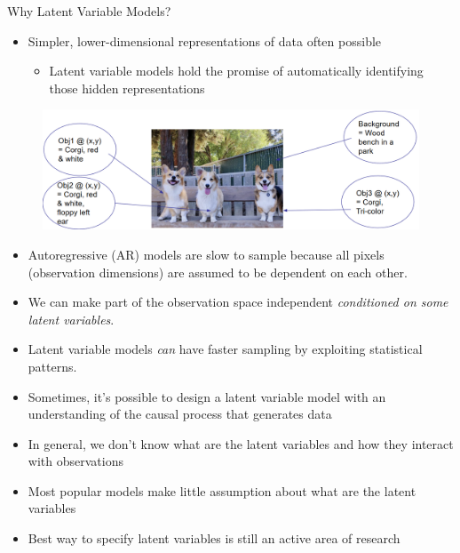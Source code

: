 \begin{frame}[allowframebreaks]{Why Latent Variable Models?}
    \begin{itemize}
        \item Simpler, lower-dimensional representations of data often possible
        \begin{itemize}
            \item Latent variable models hold the promise of automatically identifying those hidden representations
        \end{itemize}
    \end{itemize}
    \begin{figure}
        \centering
        \includegraphics[height=0.5\textheight]{images/vae/why-latent.png}
    \end{figure}

    \framebreak

    \begin{itemize}
        \item Autoregressive (AR) models are slow to sample because all pixels (observation dimensions) are assumed to be dependent on each other.
        \item We can make part of the observation space independent \textit{conditioned on some latent variables}.
        \item Latent variable models \textit{can} have faster sampling by exploiting statistical patterns.
    \end{itemize}

    \framebreak

    \begin{itemize}
        \item Sometimes, it’s possible to design a latent variable model with an understanding of the causal process that generates data
        \item In general, we don’t know what are the latent variables and how they interact with observations
        \item Most popular models make little assumption about what are the latent variables
        \item Best way to specify latent variables is still an active area of research
    \end{itemize}
\end{frame}


